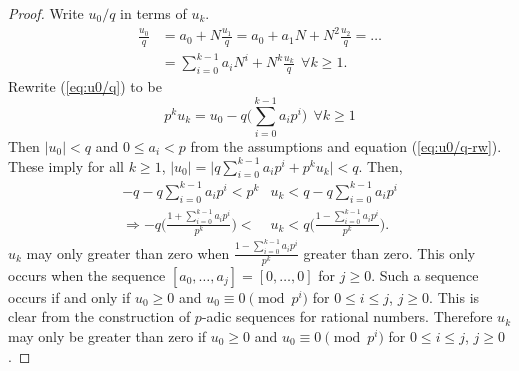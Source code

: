 \begin{proof}
  Write $u_0/q$ in terms of $u_k$.
  \begin{align}
    \frac{u_0}{q} &= a_0 + N\frac{u_1}{q} = a_0 + a_1N + N^2\frac{u_2}{q} = \dots \nonumber \\
                  &= \sum_{i=0}^{k-1}a_iN^i + N^k\frac{u_k}{q} \ \ \forall k \geq 1. \label{eq:u0/q}
  \end{align}
  Rewrite (\ref{eq:u0/q}) to be
  \begin{equation}\label{eq:u0/q-rw}
    p^ku_k=u_0-q\bigg(\sum_{i=0}^{k-1}a_ip^i\bigg) \ \ \forall k \geq 1
  \end{equation}
  Then $\lvert u_0 \rvert < q$ and $0 \leq a_i < p$ from the assumptions
  and equation (\ref{eq:u0/q-rw}). These imply for all $k \geq 1$,
  $\lvert u_0 \rvert = \lvert q\sum_{i=0}^{k-1}a_ip^i + p^ku_k \rvert < q$.
  Then,
  \begin{align*}
    -q-q\sum_{i=0}^{k-1}a_ip^i < p^k&u_k < q-q\sum_{i=0}^{k-1}a_ip^i \\
    \Rightarrow -q\bigg(\frac{1+\sum_{i=0}^{k-1}a_ip^i}{p^k}\bigg) < \ &u_k < q\bigg(\frac{1-\sum_{i=0}^{k-1}a_ip^i}{p^k}\bigg).
  \end{align*}
  $u_k$ may only greater than zero when $\frac{1-\sum_{i=0}^{k-1}a_ip^i}{p^k}$ greater than zero.
  This only occurs when the sequence $[a_0,\dots,a_j] = [0,\dots,0]$ for $j\geq0$.
  Such a sequence occurs if and only if $u_0\geq0$ and $u_0 \equiv 0 \pmod p^i$ for $0\leq i \leq j$, $j\geq0$.
  This is clear from the construction of $p$-adic sequences for
  rational numbers. Therefore $u_k$ may only be greater than zero
  if $u_0\geq0$ and $u_0 \equiv 0 \pmod p^i$ for $0\leq i \leq j$, $j\geq0$.

\end{proof}
